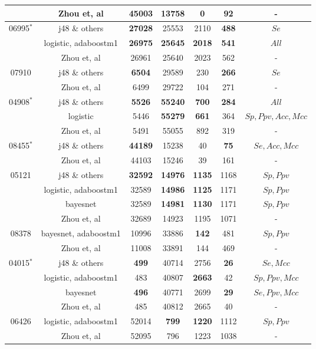 \begin{table}[h]
\begin{center}
\begin{threeparttable}
\begin{tabular}{c c c c c c c}
  & Zhou et, al & 45003 & 13758 & 0 & 92 & - \\
  \hline
  06995$^*$ & j48 \& others & \textbf{27028} & 25553 & 2110 & \textbf{488} & $Se$ \\
  & logistic, adaboostm1 & \textbf{26975} & \textbf{25645} & \textbf{2018} & \textbf{541} & $All$ \\
  & Zhou et, al & 26961 & 25640 & 2023 & 562 & - \\
  \hline
  07910 & j48 \& others & \textbf{6504} & 29589 & 230 & \textbf{266} & $Se$ \\
  & Zhou et, al & 6499 & 29722 & 104 & 271 & - \\
  \hline
  04908$^*$ & j48 \& others & \textbf{5526} & \textbf{55240} & \textbf{700} & \textbf{284} & $All$ \\
  & logistic & 5446 & \textbf{55279} & \textbf{661} & 364 & $Sp, Ppv, Acc, Mcc$ \\
  & Zhou et, al & 5491 & 55055 & 892 & 319 & - \\
  \hline
  08455$^*$ & j48 \& others & \textbf{44189} & 15238 & 40 & \textbf{75} & $Se, Acc, Mcc$ \\
  & Zhou et, al & 44103 & 15246 & 39 & 161 & - \\
  \hline
  05121 & j48 \& others & \textbf{32592} & \textbf{14976} & \textbf{1135} & 1168 & $Sp, Ppv$ \\
  & logistic, adaboostm1 & 32589 & \textbf{14986} & \textbf{1125} & 1171 & $Sp, Ppv$ \\
  & bayesnet & 32589 & \textbf{14981} & \textbf{1130} & 1171 & $Sp, Ppv$ \\
  & Zhou et, al & 32689 & 14923 & 1195 & 1071 & - \\
  \hline
  08378 & bayesnet, adaboostm1 & 10996 & 33886 & \textbf{142} & 481 & $Sp, Ppv$ \\
  & Zhou et, al & 11008 & 33891 & 144 & 469 & - \\
  \hline
  04015$^*$ & j48 \& others & \textbf{499} & 40714 & 2756 & \textbf{26} & $Se, Mcc$ \\
  & logistic, adaboostm1 & 483 & 40807 & \textbf{2663} & 42 & $Sp, Ppv, Mcc$ \\
  & bayesnet & \textbf{496} & 40771 & 2699 & \textbf{29} & $Se, Ppv, Mcc$ \\
  & Zhou et, al & 485 & 40812 & 2665 & 40 & - \\
  \hline
  06426 & logistic, adaboostm1 & 52014 & \textbf{799} & \textbf{1220} & 1112 & $Sp, Ppv$ \\
  & Zhou et, al & 52095 & 796 & 1223 & 1038 & - \\

\end{tabular}
\end{threeparttable}
\end{center}
\end{table}
